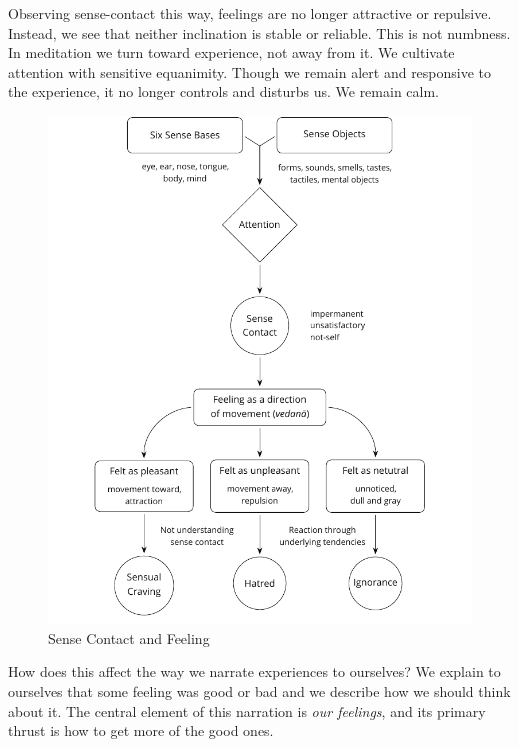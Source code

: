 Observing sense-contact this way, feelings are no longer attractive or
repulsive. Instead, we see that neither inclination is stable or
reliable. This is not numbness. In meditation we turn toward experience,
not away from it. We cultivate attention with sensitive equanimity.
Though we remain alert and responsive to the experience, it no longer
controls and disturbs us. We remain calm.

\clearpage
\figurepagelayout

\begin{figure}[h]
\caption{Sense Contact and Feeling}\label{fig-sense-contact-feeling}
\bigskip
\includegraphics[width=\linewidth]{./manuscript/tex/diagrams/sense-contact-feeling.pdf}
\end{figure}

\clearpage
\normalpagelayout


How does this affect the way we narrate experiences to ourselves? We
explain to ourselves that some feeling was good or bad and we describe
how we should think about it. The central element of this narration is
\emph{our feelings}, and its primary thrust is how to get more of the
good ones.

